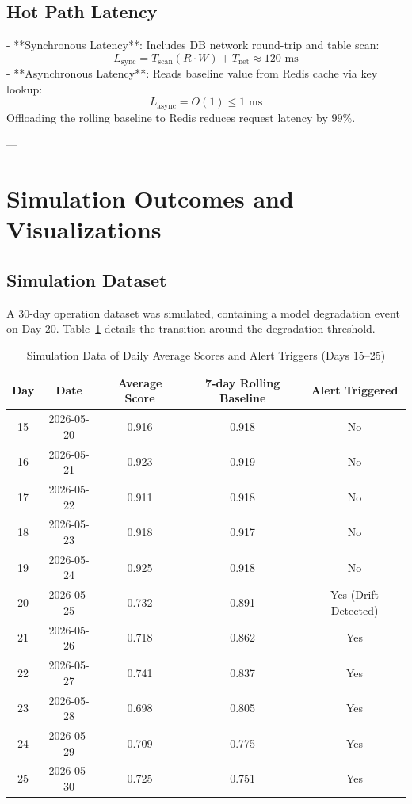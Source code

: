 \documentclass[10pt]{article}
\begin{document}
\subsection{Hot Path Latency}
- **Synchronous Latency**: Includes DB network round-trip and table scan:
  \begin{equation}
  L_{\text{sync}} = T_{\text{scan}}(R \cdot W) + T_{\text{net}} \approx 120\text{ ms}
  \end{equation}
- **Asynchronous Latency**: Reads baseline value from Redis cache via key lookup:
  \begin{equation}
  L_{\text{async}} = O(1) \le 1\text{ ms}
  \end{equation}
Offloading the rolling baseline to Redis reduces request latency by $99\%$.

---

\section{Simulation Outcomes and Visualizations}

\subsection{Simulation Dataset}
A 30-day operation dataset was simulated, containing a model degradation event on Day 20. Table~\ref{tab:simulation_data} details the transition around the degradation threshold.

\begin{table}[htbp]
\centering
\caption{Simulation Data of Daily Average Scores and Alert Triggers (Days 15--25)}
\label{tab:simulation_data}
\begin{tabular}{ccccc}
\hline
\textbf{Day} & \textbf{Date} & \textbf{Average Score} & \textbf{7-day Rolling Baseline} & \textbf{Alert Triggered} \\
\hline
15 & 2026-05-20 & 0.916 & 0.918 & No \\
16 & 2026-05-21 & 0.923 & 0.919 & No \\
17 & 2026-05-22 & 0.911 & 0.918 & No \\
18 & 2026-05-23 & 0.918 & 0.917 & No \\
19 & 2026-05-24 & 0.925 & 0.918 & No \\
20 & 2026-05-25 & 0.732 & 0.891 & Yes (Drift Detected) \\
21 & 2026-05-26 & 0.718 & 0.862 & Yes \\
22 & 2026-05-27 & 0.741 & 0.837 & Yes \\
23 & 2026-05-28 & 0.698 & 0.805 & Yes \\
24 & 2026-05-29 & 0.709 & 0.775 & Yes \\
25 & 2026-05-30 & 0.725 & 0.751 & Yes \\
\hline
\end{tabular}
\end{table}
\end{document}
